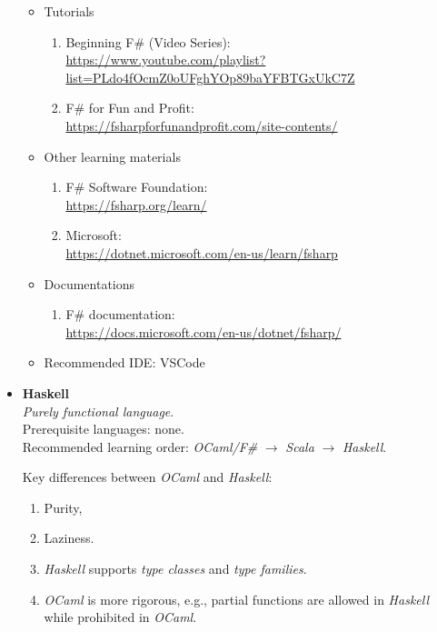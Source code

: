 \documentclass{article}
\begin{document}
\begin{itemize}
    \begin{itemize}
        \item Tutorials
        \begin{enumerate}
            \item Beginning F\# (Video Series):\\
            \href{https://www.youtube.com/playlist?list=PLdo4fOcmZ0oUFghYOp89baYFBTGxUkC7Z}{https://www.youtube.com/playlist?list=PLdo4fOcmZ0oUFghYOp89baYFBTGxUkC7Z}
            \item F\# for Fun and Profit:\\
            \href{https://fsharpforfunandprofit.com/site-contents/}{https://fsharpforfunandprofit.com/site-contents/}
        \end{enumerate}
        \item Other learning materials
        \begin{enumerate}
            \item F\# Software Foundation:\\
            \href{https://fsharp.org/learn/}{https://fsharp.org/learn/}
            \item Microsoft:\\
            \href{https://dotnet.microsoft.com/en-us/learn/fsharp}{https://dotnet.microsoft.com/en-us/learn/fsharp}
        \end{enumerate}
        \item Documentations
        \begin{enumerate}
            \item F\# documentation:\\
        \href{https://docs.microsoft.com/en-us/dotnet/fsharp/}{https://docs.microsoft.com/en-us/dotnet/fsharp/}
        \end{enumerate}
        \item Recommended IDE: VSCode
    \end{itemize}

    \item \textbf{Haskell}\\
    \emph{Purely functional language}.\\
    Prerequisite languages: none.\\
    Recommended learning order:
    \emph{OCaml/F\#} $\rightarrow$ \emph{Scala} $\rightarrow$ \emph{Haskell}.
    
    Key differences between \emph{OCaml} and \emph{Haskell}:
    \begin{enumerate}
        \item Purity,
        \item Laziness.
        \item \emph{Haskell} supports \emph{type classes} and \emph{type families}.
        \item \emph{OCaml} is more rigorous, e.g., partial functions are allowed in \emph{Haskell} while prohibited in \emph{OCaml}.
    \end{enumerate}
    

\end{itemize}
\end{document}
